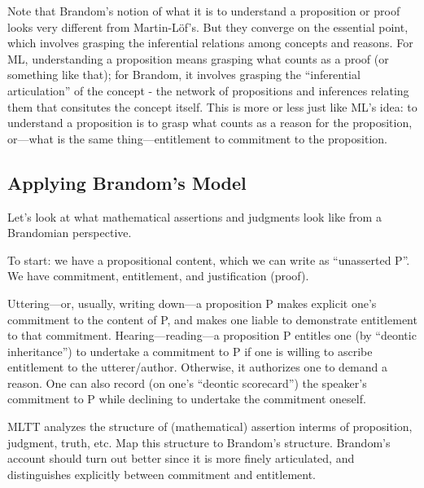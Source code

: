 Note that Brandom's notion of what it is to understand a proposition
or proof looks very different from Martin-L\"{o}f's.  But they
converge on the essential point, which involves grasping the
inferential relations among concepts and reasons.  For ML,
understanding a proposition means grasping what counts as a proof (or
something like that); for Brandom, it involves grasping the
``inferential articulation'' of the concept - the network of
propositions and inferences relating them that consitutes the concept
itself.  This is more or less just like ML's idea: to understand a
proposition is to grasp what counts as a reason for the proposition,
or---what is the same thing---entitlement to commitment to the
proposition.

\subsection{Applying Brandom's Model}
\label{subs:bapply}

Let's look at what mathematical assertions and judgments look like
from a Brandomian perspective.

To start: we have a propositional content, which we can write as
``unasserted P''.  We have commitment, entitlement, and justification
(proof).

Uttering---or, usually, writing down---a proposition P makes explicit
one's commitment to the content of P, and makes one liable to
demonstrate entitlement to that commitment.  Hearing---reading---a
proposition P entitles one (by ``deontic inheritance'') to undertake a
commitment to P if one is willing to ascribe entitlement to the
utterer/author.  Otherwise, it authorizes one to demand a reason.  One
can also record (on one's ``deontic scorecard'') the speaker's
commitment to P while declining to undertake the commitment oneself.

{\todo MLTT analyzes the structure of (mathematical) assertion interms
  of proposition, judgment, truth, etc.  Map this structure to
  Brandom's structure.  Brandom's account should turn out better since
  it is more finely articulated, and distinguishes explicitly between
  commitment and entitlement.}
